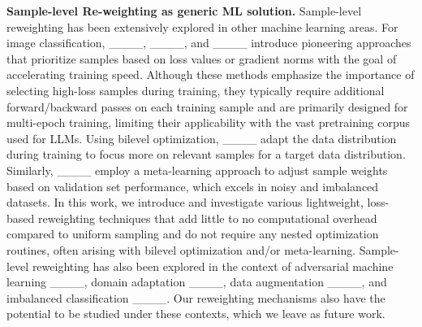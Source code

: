 \textbf{Sample-level Re-weighting as generic ML solution.} 
Sample-level reweighting has been extensively explored in other machine learning areas. For image classification, ____, ____, and ____ introduce pioneering approaches that prioritize samples based on loss values or gradient norms with the goal of accelerating training speed. Although these methods emphasize the importance of selecting high-loss samples during training, they typically require additional forward/backward passes on each training sample and are primarily designed for multi-epoch training, limiting their applicability with the vast pretraining corpus used for LLMs. Using bilevel optimization, ____ adapt the data distribution during training to focus more on relevant samples for a target data distribution. Similarly, ____ employ a meta-learning approach to adjust sample weights based on validation set performance, which excels in noisy and imbalanced datasets. In this work, we introduce and investigate various lightweight, loss-based reweighting techniques that add little to no computational overhead compared to uniform sampling and do not require any nested optimization routines, often arising with bilevel optimization and/or meta-learning.
Sample-level reweighting has also been explored in the context of adversarial machine learning ____, domain adaptation ____, data augmentation ____, and imbalanced classification ____. Our reweighting mechanisms also have the potential to be studied under these contexts, which we leave as future work.